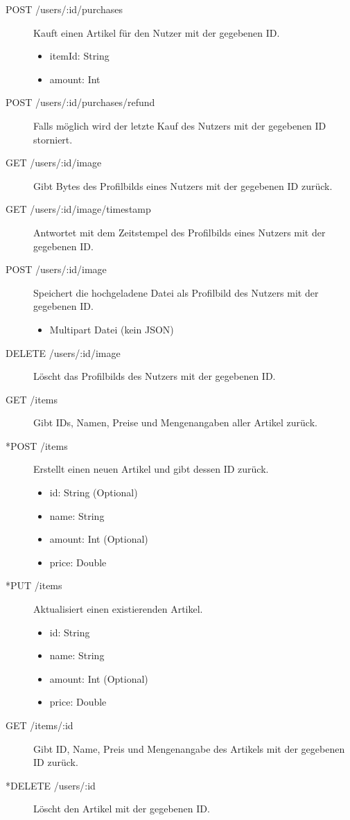 \begin{appendix}
\begin{description}
	\item[POST /users/:id/purchases] Kauft einen Artikel für den Nutzer mit der gegebenen ID.
	\begin{itemize}
		\item itemId: String
		\item amount: Int
	\end{itemize}

	\item[POST /users/:id/purchases/refund] Falls möglich wird der letzte Kauf des Nutzers mit der gegebenen ID storniert.
	
	\item[GET /users/:id/image] Gibt Bytes des Profilbilds eines Nutzers mit der gegebenen ID zurück.
	
	\item[GET /users/:id/image/timestamp] Antwortet mit dem Zeitstempel des Profilbilds eines Nutzers mit der gegebenen ID.
	
	\item[POST /users/:id/image] Speichert die hochgeladene Datei als Profilbild des Nutzers mit der gegebenen ID.
	\begin{itemize}
		\item Multipart Datei (kein JSON)
	\end{itemize}

	\item[DELETE /users/:id/image] Löscht das Profilbilds des Nutzers mit der gegebenen ID.
	
	
	\item[GET /items] Gibt IDs, Namen, Preise und Mengenangaben aller Artikel zurück.

	\item[*POST /items] Erstellt einen neuen Artikel und gibt dessen ID zurück.
	\begin{itemize}
		\item id: String (Optional)
		\item name: String
		\item amount: Int (Optional)
		\item price: Double
	\end{itemize}
	
	\item[*PUT /items] Aktualisiert einen existierenden Artikel.
	\begin{itemize}
		\item id: String
		\item name: String
		\item amount: Int (Optional)
		\item price: Double
	\end{itemize}
	
	\item[GET /items/:id] Gibt ID, Name, Preis und Mengenangabe des Artikels mit der gegebenen ID zurück.
	
	\item[*DELETE /users/:id] Löscht den Artikel mit der gegebenen ID.
\end{description}

\end{appendix}
